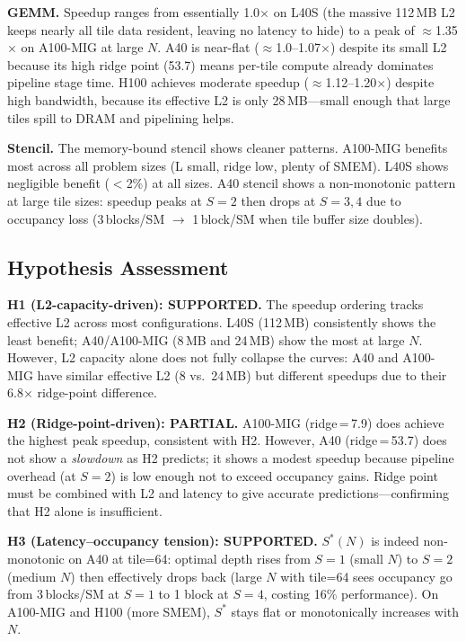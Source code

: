 \documentclass[sigplan,nonacm,10pt]{acmart}
\begin{document}
\textbf{GEMM.}
Speedup ranges from essentially 1.0$\times$ on L40S (the massive 112\,MB
L2 keeps nearly all tile data resident, leaving no latency to hide) to
a peak of $\approx$1.35$\times$ on A100-MIG at large $N$.
A40 is near-flat ($\approx$1.0--1.07$\times$) despite its small L2
because its high ridge point (53.7) means per-tile compute already
dominates pipeline stage time.
H100 achieves moderate speedup ($\approx$1.12--1.20$\times$) despite
high bandwidth, because its effective L2 is only 28\,MB---small enough
that large tiles spill to DRAM and pipelining helps.

\textbf{Stencil.}
The memory-bound stencil shows cleaner patterns.
A100-MIG benefits most across all problem sizes (L small, ridge low,
plenty of SMEM).
L40S shows negligible benefit ($<$2\%) at all sizes.
A40 stencil shows a non-monotonic pattern at large tile sizes: speedup
peaks at $S=2$ then drops at $S=3,4$ due to occupancy loss
(3\,blocks/SM $\to$ 1\,block/SM when tile buffer size doubles).

\subsection{Hypothesis Assessment}

\textbf{H1 (L2-capacity-driven): \textcolor{supported}{SUPPORTED}.}
The speedup ordering tracks effective L2 across most configurations.
L40S (112\,MB) consistently shows the least benefit; A40/A100-MIG
(8\,MB and 24\,MB) show the most at large $N$.
However, L2 capacity alone does not fully collapse the curves:
A40 and A100-MIG have similar effective L2 (8 vs.\ 24\,MB) but
different speedups due to their 6.8$\times$ ridge-point difference.

\textbf{H2 (Ridge-point-driven): \textcolor{partial}{PARTIAL}.}
A100-MIG (ridge\,=\,7.9) does achieve the highest peak speedup,
consistent with H2.
However, A40 (ridge\,=\,53.7) does not show a \emph{slowdown} as H2
predicts; it shows a modest speedup because pipeline overhead (at
$S = 2$) is low enough not to exceed occupancy gains.
Ridge point must be combined with L2 and latency to give accurate
predictions---confirming that H2 alone is insufficient.

\textbf{H3 (Latency--occupancy tension): \textcolor{supported}{SUPPORTED}.}
$S^*(N)$ is indeed non-monotonic on A40 at tile=64: optimal depth rises
from $S=1$ (small $N$) to $S=2$ (medium $N$) then effectively drops
back (large $N$ with tile=64 sees occupancy go from 3\,blocks/SM at
$S=1$ to 1 block at $S=4$, costing 16\% performance).
On A100-MIG and H100 (more SMEM), $S^*$ stays flat or monotonically
increases with $N$.
\end{document}
